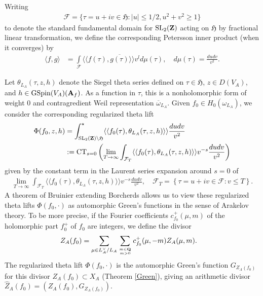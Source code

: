\documentclass{amsart}
\theoremstyle{definition}
\begin{document}
Writing \begin{align*} \mathcal{F} = \lbrace \tau = u + iv \in \mathfrak{H}: \vert u \vert \leq 1/2, u^2 + v^2 \geq 1 \rbrace \end{align*} to denote the standard 
fundamental domain for $\operatorname{SL}_2({\bf{Z}})$ acting on $\mathfrak{H}$ by fractional linear transformation, 
we define the corresponding Petersson inner product (when it converges) by 
\begin{align*} \langle f, g \rangle &= \int\limits_{\mathcal{F}} \langle \langle f(\tau), \overline{g(\tau)} \rangle \rangle v^l d \mu(\tau), 
\quad d \mu(\tau) = \frac{du dv}{v^2}. \end{align*}

Let $\theta_{L_A}(\tau, z, h)$ denote the Siegel theta series defined on $\tau \in \mathfrak{H}$, $z \in D(V_A)$, and $h \in \operatorname{GSpin}(V_A)({\bf{A}}_f)$.
As a function in $\tau$, this is a nonholomorphic form of weight $0$ and contragredient Weil representation $\overline{\omega}_{L_A}$.
Given $f_0 \in H_{0}(\omega_{L_A})$, we consider the corresponding regularized theta lift 
\begin{align*} \Phi(f_0, z, h)  &= \int_{\operatorname{SL}_2({\bf{Z}}) \backslash \mathfrak{H}}^{\star} \langle \langle f_0(\tau), \theta_{L_A} (\tau, z, h) \rangle \rangle \frac{du dv}{v^2}\\
&:= \operatorname{CT}_{s=0}  \left(  \lim_{T \rightarrow \infty} \int_{\mathcal{F}_T} \langle \langle f_0(\tau), \theta_{L_A} (\tau, z, h) \rangle \rangle v^{-s} \frac{du dv}{v^2} \right) \end{align*} 
given by the constant term in the Laurent series expansion around $s=0$ of 
\begin{align*} \lim_{T \rightarrow \infty} \int_{\mathcal{F}_T} \langle \langle f_0(\tau), \theta_{L_A} (\tau, z, h) \rangle \rangle v^{-s} \frac{du dv}{v^2},
\quad \mathcal{F}_T = \left\lbrace \tau = u + iv \in \mathcal{F}: v \leq T \right\rbrace. \end{align*}
A theorem of Bruinier \cite{BrB} extending Borcherds \cite{Bo} allows us to view these regularized theta lifts
$\Phi(f_0, \cdot)$ as automorphic Green's functions in the sense of Arakelov theory. 
To be more precise, if the Fourier coefficients $c_{f_0}^+(\mu, m)$ of the holomorphic part $f_0^+$ of $f_0$ are integers, we define the divisor
\begin{align}\label{Z_A} Z_A(f_{0}) &= \sum\limits_{ \mu \in L_A^{\vee} / L_A } \sum\limits_{m \in {\bf{Q}} \atop m >0} c_{f_{0}}^+(\mu, -m) Z_A(\mu, m). \end{align}
The regularized theta lift $\Phi(f_0, \cdot)$ is the automorphic Green's function $G_{Z_A(f_0)}$ for this divisor 
$Z_A(f_0) \subset X_A$ (Theorem \ref{Green}), giving an arithmetic divisor $\widehat{Z}_A(f_0) = (Z_A(f_0), G_{Z_A(f_0)})$.
\end{document}
